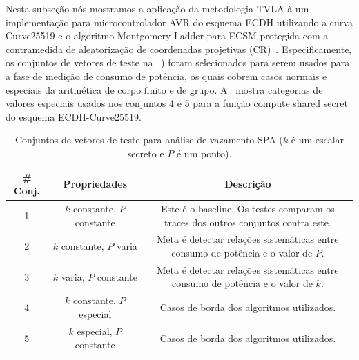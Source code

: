 %
Nesta subseção nós mostramos a aplicação da metodologia TVLA à um implementação para microcontrolador AVR do esquema ECDH utilizando a curva Curve25519 e o algoritmo Montgomery Ladder para ECSM protegida com a contramedida de aleatorização de coordenadas projetivas (CR)~\cite{Nascimento2015_Space}.
%
Especificamente, os conjuntos de vetores de teste na ~) foram selecionados para serem usados para a fase de medição de consumo de potência, os quais cobrem casos normais e especiais da aritmética de corpo finito e de grupo.
%
%
A~ mostra categorias de valores especiais usados nos conjuntos 4 e 5 para a função compute shared secret do esquema ECDH-Curve25519.

\begin{table}[htb]\scriptsize
	\caption{Conjuntos de vetores de teste para análise de vazamento SPA ($k$ é um escalar secreto e $P$ é um ponto).}
	\label{tbSetsTVs}
	\centering%
	\bgroup
	\def\arraystretch{\tblvertpaddingfactor} %
	\setlength{\tabcolsep}{\tblhorizpadding} %
	\begin{tabular}{|c|c|c|} 	%
		\hline 
		\# Conj.	& Propriedades	& Descrição \\ \hline \hline
		1		& $k$ constante, $P$ constante	&	Este é o baseline. Os testes comparam os traces dos outros conjuntos contra este. \\ \hline 
		2		& $k$ constante, $P$ varia	&	Meta é detectar relações sistemáticas entre consumo de potência e o valor de $P$. %
		\\ \hline 
		3		& $k$ varia, $P$ constante	&	Meta é detectar relações sistemáticas entre consumo de potência e o valor de $k$. \\ \hline  %
		4		& $k$ constante, $P$ especial	&	Casos de borda dos algoritmos utilizados. \\ \hline %
		5		& $k$ especial, $P$ constante	&	Casos de borda dos algoritmos utilizados. %
		\\ \hline
	\end{tabular}
	\egroup
\end{table}

